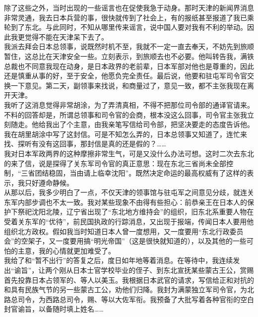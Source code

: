 除了这些之外，当时出现的一些谣言也在促使我急于动身。那时天津的新闻界消息非常灵通，我去日本兵营的事，很快就传到了社会上，有的报纸甚至报道了我已乘轮到了东北。与此同时，不知从哪里传来谣言，说中国人要对我有不利的举动。因此我更觉得不能在天津呆下去了。\\

我派去拜会日本总领事，说既然时机不至，我就不一定一直去奉天，不妨先到旅顺暂住，这总比在天津安全一些。立刻表示，到旅顺去也不必要。他叫转告我，满铁总裁也不同意我现在动身，是日本政界的老前辈，日本军部对他也是尊重的，因此还是慎重从事的好，至于安全，他愿负完全责任。最后说，他要和驻屯军司令官交换一下意见。第二天，副领事来找说，和商量过了，意见一致，都不主张我现在离开天津。\\

我听了这消息觉得非常胡涂，为了弄清真相，不得不把那位司令部的通译官请来。不料的回答却是，所谓总领事和司令官的会商，根本没这么回事，司令官主张我立刻随走。他给我出了个主意，由我亲笔写信给司令部，把坚决要走的态度告诉他。我在胡里胡涂中写了这封信。可是不知怎么弄的，日本总领事又知道了，连忙来找、探听有没有这回事，那封信是真的还是假的？……\\

我对日本军政两界的这种摩擦非常生气，可是又没什么办法可想。这时二次去东北的来了信，说是探得了关东军司令官的真正意思：现在东北三省尚未全部控制，“三省团结稳固，当由请上临幸沈阳”。既然决定命运的最高权威有了这样的表示，我只好遵命静候。\\

从那以后，我多少明白了一点，不仅天津的领事馆与驻屯军之间意见分歧，就连关东军内部步调也不太一致。我对某些现象不由得有些担心：前恭亲王在日本人的保护下祭祀沈阳北陵，辽宁省出现了“东北地方维持会”的组织，旧东北系重要人物在受着关东军的“优待”，前民国执政的行踪消息，又出现于报端，传闻日本人要用他组织北方政权。假如我当时知道日本人曾一度想用，又一度要用“东北行政委员会”的空架子，又一度要用搞“明光帝国”（这是很快就知道的），以及其他的一些可怕的主意，我的心情就更加难受了。\\

我给了和“暂不出行”的答复之后，度日如年地等着消息。在等待中，我连续发出“谕旨”，让两个刚从日本士官学校毕业的侄子、到东北宣抚某些蒙古王公，赏赐首先投靠日本占领军的、等人以美玉。我根据日本武官的请求，写信给正和对抗的和具有民族气节的另一些蒙古工公，劝他们归降。我封为满蒙独立军司令官，为北路总司令，为西路总司令，赐、等以大佐军衔。我预备了大批写着各种官衔的空白封官谕旨，以备随时填上姓名……\\


